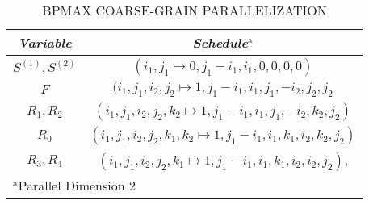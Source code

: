 \begin{table}[htbp]
\caption{\uppercase{BPMax coarse-grain Parallelization}}
\begin{center}
\begin{tabular}{|c|c|}
\hline
\textbf{\textit{Variable}}& \textbf{\textit{Schedule}}$^{\mathrm{a}}$ \\
\hline
  $S^{(1)}, S^{(2)}$ & $(i_{1},j_{1} \mapsto 0, j_{1}-i_{1}, i_{1}, 0, 0, 0, 0)$   \\
\cline{1-2} 
  $F$ & $(i_{1},j_{1},i_{2},j_{2} \mapsto 1, j_{1}-i_{1}, i_{1}, j_{1}, -i_{2}, j_{2}, j_{2}$   \\
\cline{1-2} 
$R_{1}, R_{2}$ & $(i_{1},j_{1},i_{2},j_{2},k_{2} \mapsto 1, j_{1}-i_{1}, i_{1}, j_{1}, -i_{2}, k_{2}, j_{2})$ \\
 \cline{1-2} 
$R_{0}$ & $(i_{1},j_{1},i_{2},j_{2},k_{1},k_{2} \mapsto 1, j_{1}-i_{1}, i_{1}, k_{1}, i_{2}, k_{2}, j_{2})$    \\
\cline{1-2} 
$R_{3}, R_{4}$ & $(i_{1},j_{1},i_{2},j_{2},k_{1} \mapsto 1, j_{1}-i_{1}, i_{1}, k_{1}, i_{2}, i_{2}, j_{2})$,    \\
 \cline{1-2} 
\hline
\multicolumn{2}{l}{$^{\mathrm{a}}$Parallel Dimension 2}
\end{tabular}
\label{tab:bpm_coarse_grain_schedule}
\end{center}
\end{table}